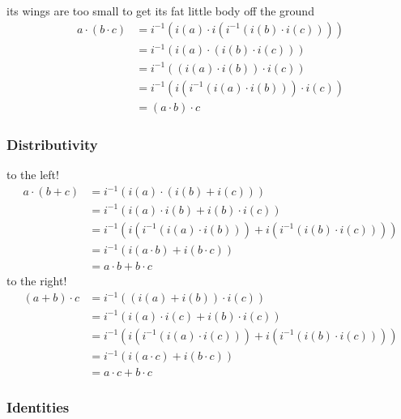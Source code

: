 \documentclass[12pt]{article}
\begin{document}
its wings are too small to get its fat little body off the ground
\begin{align*}
  a \cdot (b \cdot c)
   & = i^{-1}(i(a) \cdot i(i^{-1}(i(b) \cdot i(c)))) \\
   & = i^{-1}(i(a) \cdot (i(b) \cdot i(c)))          \\
   & = i^{-1}((i(a) \cdot i(b)) \cdot i(c))          \\
   & = i^{-1}(i(i^{-1}(i(a) \cdot i(b))) \cdot i(c)) \\
   & = (a \cdot b) \cdot c
\end{align*}

\subsubsection{Distributivity}

to the left!
\begin{align*}
  a \cdot (b + c)
   & = i^{-1}(i(a) \cdot (i(b) + i(c)))                                \\
   & = i^{-1}(i(a) \cdot i(b) + i(b) \cdot i(c))                       \\
   & = i^{-1}(i(i^{-1}(i(a) \cdot i(b))) + i(i^{-1}(i(b) \cdot i(c)))) \\
   & = i^{-1}(i(a \cdot b) + i(b \cdot c))                             \\
   & = a \cdot b + b \cdot c
\end{align*}
to the right!
\begin{align*}
  (a + b) \cdot c
   & = i^{-1}((i(a) + i(b)) \cdot i(c))                                \\
   & = i^{-1}(i(a) \cdot i(c) + i(b) \cdot i(c))                       \\
   & = i^{-1}(i(i^{-1}(i(a) \cdot i(c))) + i(i^{-1}(i(b) \cdot i(c)))) \\
   & = i^{-1}(i(a \cdot c) + i(b \cdot c))                             \\
   & = a \cdot c + b \cdot c
\end{align*}

\subsubsection{Identities}
\end{document}
